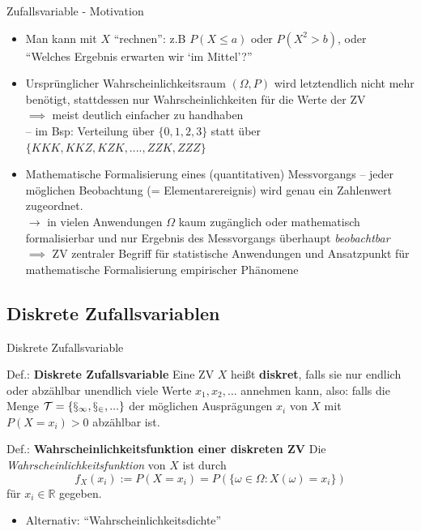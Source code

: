 \documentclass[
  10pt,
  ignorenonframetext,
]{beamer}
\providecommand{\tightlist}{%
  \setlength{\itemsep}{0pt}\setlength{\parskip}{0pt}}
\begin{document}
\begin{frame}{Zufallsvariable - Motivation}
\label{zufallsvariable---motivation}
\begin{itemize}
\item
  Man kann mit \(X\) ``rechnen'': z.B \(P(X \leq a)\) oder
  \(P(X^2 > b)\), oder ``Welches Ergebnis erwarten wir `im Mittel'?''
\item
  Ursprünglicher Wahrscheinlichkeitsraum \((\Omega, P)\) wird
  letztendlich nicht mehr benötigt, stattdessen nur Wahrscheinlichkeiten
  für die Werte der ZV\\
  \(\implies\) meist deutlich einfacher zu handhaben\\
  -- im Bsp: Verteilung über \(\{0,1,2,3\}\) statt über
  \(\{KKK, KKZ, KZK, ...., ZZK, ZZZ\}\)
\item
  Mathematische Formalisierung eines (quantitativen) Messvorgangs --
  jeder möglichen Beobachtung (= Elementarereignis) wird genau ein
  Zahlenwert zugeordnet.\\
  \(\longrightarrow\) in vielen Anwendungen \(\Omega\) kaum zugänglich
  oder mathematisch formalisierbar und nur Ergebnis des Messvorgangs
  überhaupt \emph{beobachtbar}\\
  \(\implies\) ZV zentraler Begriff für statistische Anwendungen und
  Ansatzpunkt für mathematische Formalisierung empirischer Phänomene
\end{itemize}
\end{frame}

\subsection{Diskrete Zufallsvariablen}\label{diskrete-zufallsvariablen}

\begin{frame}{Diskrete Zufallsvariable}
\label{diskrete-zufallsvariable}
\begin{block}{Def.: \textbf{Diskrete Zufallsvariable}}
\label{def.-diskrete-zufallsvariable}
Eine ZV \(X\) heißt \textbf{diskret}, falls sie nur endlich oder
abzählbar unendlich viele Werte \(x_1, x_2, ...\) annehmen kann, also:
falls die Menge \(\cal{T}=\{x_1, x_2, ...\}\) der möglichen Ausprägungen
\(x_i\) von \(X\) mit \(P(X = x_i)  > 0\) abzählbar ist.
\end{block}

\begin{block}{Def.: \textbf{Wahrscheinlichkeitsfunktion einer diskreten
ZV}}
\label{def.-wahrscheinlichkeitsfunktion-einer-diskreten-zv}
Die \emph{Wahrscheinlichkeitsfunktion} von \(X\) ist durch
\[f_X(x_i) := P(X = x_i) = P\left(\{\omega \in \Omega: X(\omega) = x_i\}\right)\]
für \(x_i \in \mathbb{R}\) gegeben.
\end{block}

\begin{itemize}
\tightlist
\item
  Alternativ: ``Wahrscheinlichkeitsdichte''
\end{itemize}

\end{frame}
\end{document}
